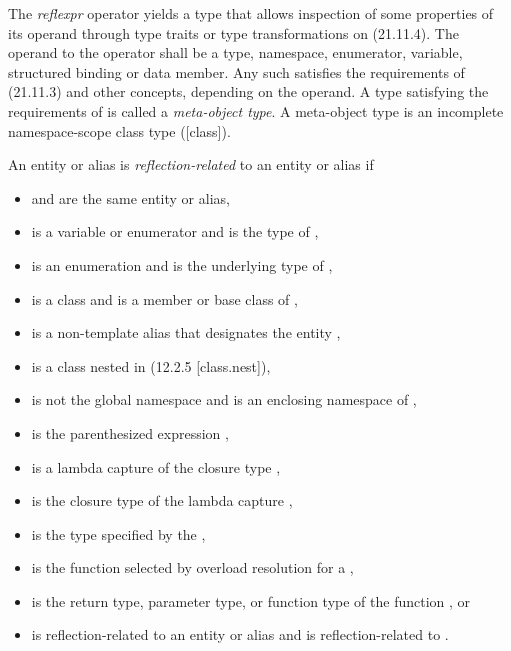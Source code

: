 \begin{std.txt}\color{addclr}

    The \emph{reflexpr} operator yields a type  that allows inspection
    of some properties of its operand through type traits or type transformations
    on  (21.11.4).  The operand to the  operator shall
    be a type, namespace, enumerator, variable, structured binding or data
    member.  Any such  satisfies the requirements of
     (21.11.3) and other  concepts,
    depending on the operand.  A type satisfying the requirements of
     is called a \emph{meta-object type}.  A meta-object
    type is an incomplete namespace-scope class type ([class]).

    An entity or alias  is \emph{reflection-related} to an entity or
    alias  if

    \begin{itemize}
      \item {} and  are the same entity or alias,
      \item {} is a variable or enumerator and  is the type of ,
      \item {} is an enumeration and  is the underlying type of ,
      \item {} is a class and  is a member or base class of ,
      \item {} is a non-template alias that designates the entity ,
      \item {} is a class nested in  (12.2.5 [class.nest]),
      \item {} is not the global namespace and  is an enclosing namespace of ,
      \item {} is the parenthesized expression ,
      \item {} is a lambda capture of the closure type ,
      \item {} is the closure type of the lambda capture ,
      \item {} is the type specified by the  ,
      \item {} is the function selected by overload resolution for a  ,
      \item {} is the return type, parameter type, or function type of the function , or
      \item {} is reflection-related to an entity or alias  and  is reflection-related to .
    \end{itemize}


\end{std.txt}
